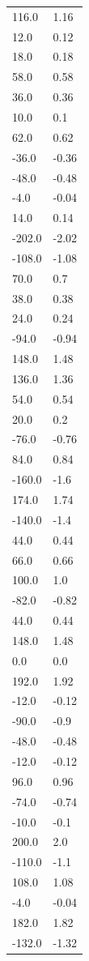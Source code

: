 \begin{longtable}{ll}
116.0 & 1.16 \\
12.0 & 0.12 \\
18.0 & 0.18 \\
58.0 & 0.58 \\
36.0 & 0.36 \\
10.0 & 0.1 \\
62.0 & 0.62 \\
-36.0 & -0.36 \\
-48.0 & -0.48 \\
-4.0 & -0.04 \\
14.0 & 0.14 \\
-202.0 & -2.02 \\
-108.0 & -1.08 \\
70.0 & 0.7 \\
38.0 & 0.38 \\
24.0 & 0.24 \\
-94.0 & -0.94 \\
148.0 & 1.48 \\
136.0 & 1.36 \\
54.0 & 0.54 \\
20.0 & 0.2 \\
-76.0 & -0.76 \\
84.0 & 0.84 \\
-160.0 & -1.6 \\
174.0 & 1.74 \\
-140.0 & -1.4 \\
44.0 & 0.44 \\
66.0 & 0.66 \\
100.0 & 1.0 \\
-82.0 & -0.82 \\
44.0 & 0.44 \\
148.0 & 1.48 \\
0.0 & 0.0 \\
192.0 & 1.92 \\
-12.0 & -0.12 \\
-90.0 & -0.9 \\
-48.0 & -0.48 \\
-12.0 & -0.12 \\
96.0 & 0.96 \\
-74.0 & -0.74 \\
-10.0 & -0.1 \\
200.0 & 2.0 \\
-110.0 & -1.1 \\
108.0 & 1.08 \\
-4.0 & -0.04 \\
182.0 & 1.82 \\
-132.0 & -1.32 \\

\end{longtable}
